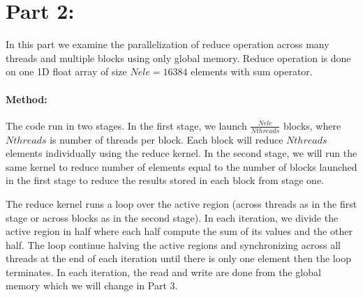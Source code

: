 \documentclass[12pt] {article}
\begin{document}
\section*{Part 2:}
In this part we examine the parallelization of reduce operation across many threads and multiple blocks using only global memory. Reduce operation is done on one 1D float array of size $Nele=16384$ elements with sum operator. 

\paragraph{Method:}

The code run in two stages. In the first stage, we launch $\frac{Nele}{Nthreads}$ blocks, where $Nthreads$ is number of threads per block. Each block will reduce $Nthreads$ elements individually using the reduce kernel. In the second stage, we will run the same kernel to reduce number of elements equal to the number of blocks launched in the first stage to reduce the results stored in each block from stage one. 

The reduce kernel runs a loop over the active region (across threads as in the first stage or across blocks as in the second stage). In each iteration, we divide the active region in half where each half compute the sum of its values and the other half. The loop continue halving the active regions and synchronizing across all threads at the end of each iteration until there is only one element then the loop terminates. In each iteration, the read and write are done from the global memory which we will change in Part 3.  
\end{document}
